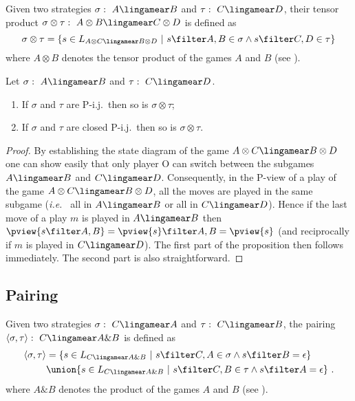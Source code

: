  Given two strategies $\sigma :\ A
\lingamear B$  and $\tau :\ C\lingamear D$, their tensor product
$\sigma \otimes \tau :\ A\otimes B \lingamear C\otimes D$ is defined
as
$$\sigma \otimes \tau = \{ s \in L_{A\otimes C \lingamear B\otimes
D} \ | \ s \filter A,B \in \sigma \wedge s \filter C,D \in \tau \} $$
 where $A\otimes B$ denotes the tensor product of the games $A$ and $B$ (see \cite{abramsky:game-semantics-tutorial}).
\begin{proposition}
Let $\sigma :\ A \lingamear B$  and $\tau :\ C\lingamear D$.
\begin{enumerate}
\item If $\sigma$ and $\tau$ are P-i.j.\
then so is $\sigma \otimes \tau$;
\item If $\sigma$ and $\tau$ are closed P-i.j.\ then so is $\sigma \otimes \tau$.
\end{enumerate}
\end{proposition}

\begin{proof}
By establishing the state diagram of the game $A\otimes C \lingamear
B\otimes D$ one can show easily that only player O can switch
between the subgames $A\lingamear B$ and $C\lingamear D$.
Consequently, in the P-view of a play of the game $A\otimes C
\lingamear B\otimes D$, all the moves are played in the same subgame
({\it i.e.~} all in $A\lingamear B$ or all in $C\lingamear D$).
Hence if the last move of a play $m$ is played in $A\lingamear B$
then $\pview{s\filter A,B} = \pview{s} \filter A,B = \pview{s}$ (and
reciprocally if $m$ is played in $C\lingamear D$). The first part of
the proposition then follows immediately. The second part is also
straightforward.
\end{proof}


\subsection{Pairing} Given two strategies $\sigma :\ C \lingamear A$
and $\tau :\ C\lingamear B$, the pairing $\langle \sigma , \tau
\rangle :\ C \lingamear A\& B$ is defined as
\begin{align*}
\langle \sigma , \tau \rangle
    &= \{ s \in L_{C \lingamear A\& B} \ | \ s \filter C,A \in \sigma \wedge s \filter B = \epsilon \} \\
    & \union \{ s \in L_{C \lingamear A\& B} \ | \ s \filter C,B \in \tau \wedge s \filter A = \epsilon \}
\ .
\end{align*}
 where $A\& B$ denotes the product of the games $A$ and $B$ (see \cite{abramsky:game-semantics-tutorial}).

